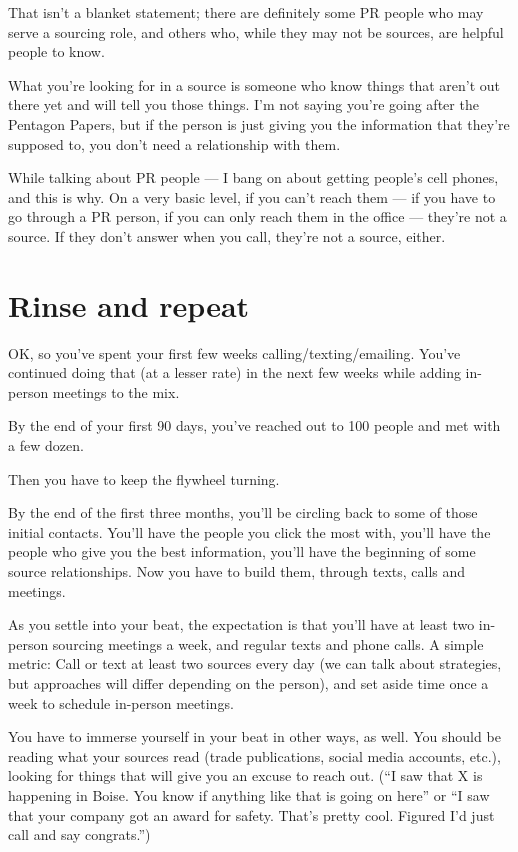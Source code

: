 \documentclass[
  11pt,
  american,
  letterpaperpaper,
  extrafontsizes,onecolumn,openright
  ]{memoir}
\begin{document}
That isn't a blanket statement; there are definitely some PR people who may serve a sourcing role, and others who, while they may not be sources, are helpful people to know.

What you're looking for in a source is someone who know things that aren't out there yet and will tell you those things. I'm not saying you're going after the Pentagon Papers, but if the person is just giving you the information that they're supposed to, you don't need a relationship with them.

While talking about PR people --- I bang on about getting people's cell phones, and this is why. On a very basic level, if you can't reach them --- if you have to go through a PR person, if you can only reach them in the office --- they're not a source. If they don't answer when you call, they're not a source, either.

\hypertarget{rinse-and-repeat}{%
\section*{Rinse and repeat}\label{rinse-and-repeat}}

OK, so you've spent your first few weeks calling/texting/emailing. You've continued doing that (at a lesser rate) in the next few weeks while adding in-person meetings to the mix.

By the end of your first 90 days, you've reached out to 100 people and met with a few dozen.

Then you have to keep the flywheel turning.

By the end of the first three months, you'll be circling back to some of those initial contacts. You'll have the people you click the most with, you'll have the people who give you the best information, you'll have the beginning of some source relationships. Now you have to build them, through texts, calls and meetings.

As you settle into your beat, the expectation is that you'll have at least two in-person sourcing meetings a week, and regular texts and phone calls. A simple metric: Call or text at least two sources every day (we can talk about strategies, but approaches will differ depending on the person), and set aside time once a week to schedule in-person meetings.

You have to immerse yourself in your beat in other ways, as well. You should be reading what your sources read (trade publications, social media accounts, etc.), looking for things that will give you an excuse to reach out. (\enquote{I saw that X is happening in Boise. You know if anything like that is going on here} or \enquote{I saw that your company got an award for safety. That's pretty cool. Figured I'd just call and say congrats.})
\end{document}
